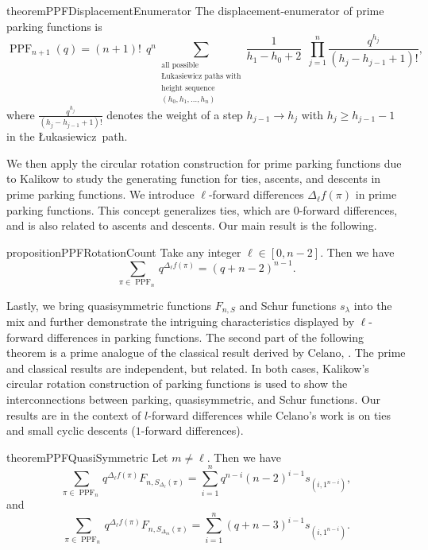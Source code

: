 \documentclass[12pt,reqno]{amsart}
\theoremstyle{definition}
\theoremstyle{remark}
\newcommand{\fd}{\Delta_{\ell} f}
\newcommand{\SetL}[1]{S_{\Delta_{#1}}}
\DeclareMathOperator{\PPF}{PPF}
\newcommand{\Luka}{\L ukasiewicz}
\begin{document}
\begin{restatable}{theorem}{PPFDisplacementEnumerator}
\label{thm:displacement-enumerator}
The displacement-enumerator of prime parking functions is
\[
\PPF_{n+1}(q)=(n+1)! ~~q^n \sum_{\substack{\text{all possible}\\\text{\Luka~paths with} \\ \text{height sequence } \\
(h_0, h_1, \dots, h_n)}} \frac{1}{h_1-h_0+2}  ~~\prod_{j=1}^{n} \frac{q^{h_{j}}}{(h_{j}-h_{j-1}+1)!},
\]
where $\frac{q^{h_{j}}}{(h_{j}-h_{j-1}+1)!}$ denotes the weight of a step $h_{j-1} \rightarrow h_{j}$ with $h_{j} \geq h_{j-1}-1$ in the \Luka~path.  
\end{restatable}


We then apply the circular rotation construction for prime parking functions due to Kalikow \cite[pp.~141-142]{Stanley} to study the generating function for ties, ascents, and descents in prime parking functions. We introduce $\ell$-forward differences $\Delta_\ell f(\pi)$ in prime parking functions. This concept generalizes ties, which are $0$-forward differences, and is also related to ascents and descents. Our main result is the following.

\begin{restatable}{proposition}{PPFRotationCount}
\label{prop:q_l-des}
Take any integer $\ell \in [0, n-2]$. Then we have
\begin{equation}
\sum_{\pi \in \PPF_n} q^{
\fd(\pi)}=(q+n-2)^{n-1}.
\end{equation}
\end{restatable}

Lastly, we bring quasisymmetric functions $F_{n, S}$ and Schur functions $s_\lambda$ into the mix and further demonstrate the intriguing characteristics displayed by $\ell$-forward differences in parking functions. 
The second part of the following theorem is a prime analogue of the classical result derived by Celano, \cite{Celano:SchurPositivity}.  The prime and classical results are independent, but related.  In both cases, Kalikow's circular rotation construction of parking functions is used to show the interconnections between parking, quasisymmetric, and Schur functions.  Our results are in the context of $l$-forward differences while Celano's work is on ties and small cyclic descents ($1$-forward differences).

\begin{restatable}{theorem}{PPFQuasiSymmetric}
\label{thm:quasisym-corr}
Let $m \neq \ell$. Then we have
$$ \sum_{\pi \in \PPF_n} q^{
\fd(\pi)} F_{n, \SetL{\ell}(\pi)}=\sum_{i=1}^n q^{n-i}(n-2)^{i-1} s_{(i,1^{n-i})},$$
and
$$ \sum_{\pi \in \PPF_n} q^{
\fd(\pi)} F_{n, \SetL{m}(\pi)}= \sum_{i=1}^n (q+n-3)^{i-1} s_{(i,1^{n-i})}.$$
\end{restatable}
\end{document}
